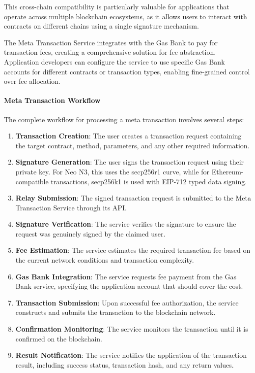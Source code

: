 \documentclass[12pt,a4paper]{article}
\begin{document}
This cross-chain compatibility is particularly valuable for applications that operate across multiple blockchain ecosystems, as it allows users to interact with contracts on different chains using a single signature mechanism.

The Meta Transaction Service integrates with the Gas Bank to pay for transaction fees, creating a comprehensive solution for fee abstraction. Application developers can configure the service to use specific Gas Bank accounts for different contracts or transaction types, enabling fine-grained control over fee allocation.



\paragraph{Meta Transaction Workflow}
The complete workflow for processing a meta transaction involves several steps:

\begin{enumerate}
    \item \textbf{Transaction Creation}: The user creates a transaction request containing the target contract, method, parameters, and any other required information.
    
    \item \textbf{Signature Generation}: The user signs the transaction request using their private key. For Neo N3, this uses the secp256r1 curve, while for Ethereum-compatible transactions, secp256k1 is used with EIP-712 typed data signing.
    
    \item \textbf{Relay Submission}: The signed transaction request is submitted to the Meta Transaction Service through its API.
    
    \item \textbf{Signature Verification}: The service verifies the signature to ensure the request was genuinely signed by the claimed user.
    
    \item \textbf{Fee Estimation}: The service estimates the required transaction fee based on the current network conditions and transaction complexity.
    
    \item \textbf{Gas Bank Integration}: The service requests fee payment from the Gas Bank service, specifying the application account that should cover the cost.
    
    \item \textbf{Transaction Submission}: Upon successful fee authorization, the service constructs and submits the transaction to the blockchain network.
    
    \item \textbf{Confirmation Monitoring}: The service monitors the transaction until it is confirmed on the blockchain.
    
    \item \textbf{Result Notification}: The service notifies the application of the transaction result, including success status, transaction hash, and any return values.
\end{enumerate}
\end{document}
